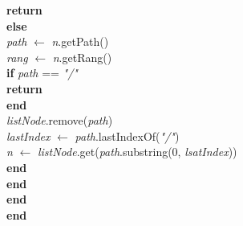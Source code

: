 \documentclass[a4paper,11pt]{report}
\begin{document}
\begin{flushleft}
\begin{framed}
\begin{enumerate}
\begin{tabbing}
						\> \> \> \> \textbf{return}\\
						\> \> \> \textbf{else}\\
						\> \> \> \> \textit{path} $\leftarrow$ \textit{n}.getPath()\\
						\> \> \> \> \textit{rang} $\leftarrow$ \textit{n}.getRang()\\
						\> \> \> \> \textbf{if }\= \textit{path} == \textit{"/"}\\
						\> \> \> \> \> \textbf{return}\\
						\> \> \> \> \textbf{end}\\
						\> \> \> \> \textit{listNode}.remove(\textit{path})\\
						\> \> \> \> \textit{lastIndex} $\leftarrow$ \textit{path}.lastIndexOf(\textit{"/"})\\
						\> \> \> \> \textit{n} $\leftarrow$ \textit{listNode}.get(\textit{path}.substring(0, \textit{lsatIndex}))\\
						\> \> \> \textbf{end}\\
						\> \> \textbf{end}\\
						\> \textbf{end}\\
					\textbf{end}
				\end{tabbing}
		\end{enumerate}	
	\end{framed}
\end{flushleft}
\end{document}
